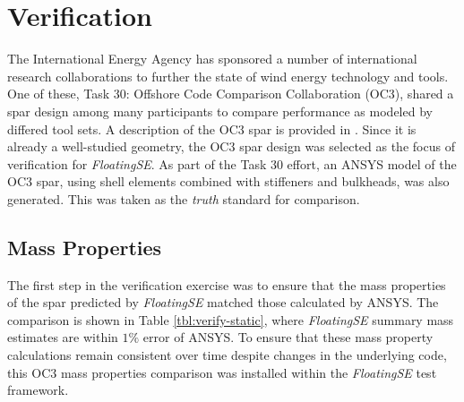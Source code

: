 \chapter{Verification}
\label{sec:verify}

The International Energy Agency has sponsored a number of international
research collaborations to further the state of wind energy technology and
tools.  One of these, Task 30: Offshore Code Comparison Collaboration
(OC3), shared a spar design among many participants to compare
performance as modeled by differed tool sets.  A description of the OC3
spar is provided in \citet{OC3}.  Since it is already a
well-studied geometry, the OC3 spar design was selected as the focus of
verification for \textit{FloatingSE}.  As part of the Task 30 effort,
an ANSYS model of the OC3 spar, using shell elements combined with
stiffeners and bulkheads, was also generated.  This was taken as
the \textit{truth} standard for comparison.

\section{Mass Properties}
The first step in the verification exercise was to ensure that the mass
properties of the spar predicted by \textit{FloatingSE} matched those
calculated by ANSYS.  The comparison is shown in Table \ref{tbl:verify-static},
where \textit{FloatingSE} summary mass estimates are within $1\%$ error
of ANSYS.  To ensure that these mass property calculations remain
consistent over time despite changes in the underlying code, this OC3
mass properties comparison was installed within the \textit{FloatingSE}
test framework.

